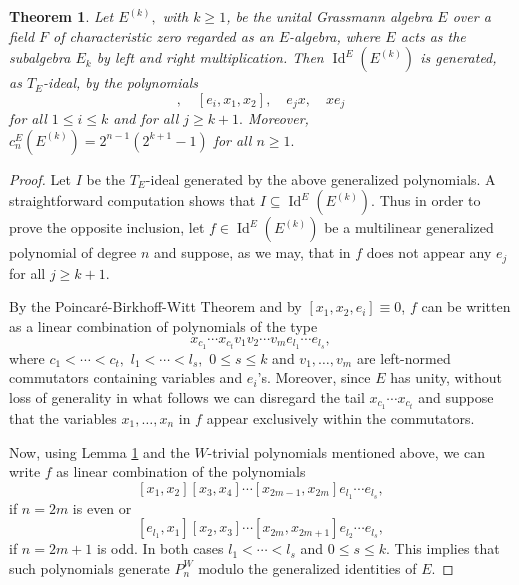 \documentclass[reqno]{amsart}
\newtheorem{theorem}{Theorem}
\theoremstyle{definition}
\numberwithin{equation}{section}
\numberwithin{theorem}{section}
\DeclareMathOperator{\I}{Id}
\begin{document}
\begin{theorem}\label{identitadiEk}
    Let $E^{(k)},$ with $k\geq 1$, be the unital Grassmann algebra $E$ over a field $F$ of characteristic zero regarded as an $E$-algebra, where $E$ acts as the subalgebra $E_k$ by left and right multiplication.
    Then $\I^E(E^{(k)})$ is generated, as $T_E$-ideal, by the polynomials 
    \begin{equation*}
    [x_1,x_2,x_3], \quad [e_i,x_1,x_2], \quad e_jx, \quad xe_j
\end{equation*}
for all $1\leq i\leq k$ and for all $j\geq k+1.$ Moreover, $c^E_n(E^{(k)}) = 2^{n-1}(2^{k+1}-1)$ for all $n\geq 1.$
\end{theorem}
\begin{proof}
    Let $I$ be the $T_E$-ideal generated by the above generalized polynomials. A straightforward computation shows that $I\subseteq \I^E(E^{(k)}).$ Thus in order to prove the opposite inclusion, let $f\in\I^E(E^{(k)})$ be a multilinear generalized polynomial of degree $n$ and suppose, as we may, that in $f$ does not appear any $e_j$ for all $j\geq k+1.$ 

    By the Poincaré-Birkhoff-Witt Theorem and by $[x_1,x_2,e_i]\equiv 0$, $f$ can be written as a linear combination of polynomials of the type
    $$
    x_{c_1}\cdots x_{c_t}v_1v_2\cdots v_me_{l_1}\cdots e_{l_s},
    $$
    where $c_1<\cdots < c_t,$ $l_1<\cdots <l_s,$ $0\leq s\leq k$ and $v_1,\ldots, v_m$ are left-normed commutators containing variables and $e_i$'s. Moreover, since $E$ has unity, without loss of generality in what follows we can disregard the tail $x_{c_1}\cdots x_{c_t}$ and suppose that the variables $x_1,\ldots,x_n$ in $f$ appear exclusively within the commutators.
    
    Now, using Lemma \ref{identitadiEk} and the $W$-trivial polynomials mentioned above, we can write $f$ as linear combination of the polynomials
    \begin{equation}\label{polinomigradopari}
    [x_{1},x_{2}][x_3,x_4]\cdots [x_{2m-1},x_{2m}]e_{l_1}\cdots e_{l_s},
    \end{equation}
    if $n=2m$ is even or 
    \begin{equation}\label{polinomigradodispari}
    [e_{l_1},x_{1}][x_2,x_3]\cdots [x_{2m},x_{2m+1}]e_{l_2}\cdots e_{l_s},
    \end{equation}
    if $n=2m+1$ is odd. In both cases $l_1<\cdots <l_s$ and $0\leq s\leq k.$ This implies that such polynomials generate $P^W_n$ modulo the generalized identities of $E.$


\end{proof}
\end{document}
